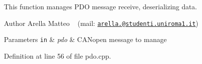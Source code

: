 This function manages P\+DO message receive, deserializing data. 

\begin{DoxyAuthor}{Author}
Arella Matteo ~\newline
 (mail\+: \href{mailto:arella.1646983@studenti.uniroma1.it}{\tt arella.@studenti.\+uniroma1.\+it})
\end{DoxyAuthor}

\begin{DoxyParams}[1]{Parameters}
\mbox{\tt in}  & {\em pdo} & C\+A\+Nopen message to manage \\
\hline
\end{DoxyParams}


Definition at line 56 of file pdo.\+cpp.

